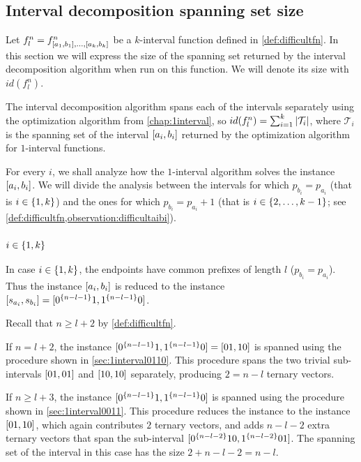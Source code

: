 \subsection{Interval decomposition spanning set size}


Let $f_l^n =
f^n_{[a_1, b_1], \ldots, [a_k, b_k]}$
be a $k$-interval function
defined in \cref{def:difficultfn}.
In this section we will express
the size of the spanning set
returned by the interval decomposition algorithm
when run on this function.
We will denote its size with $id(f_l^n)$.

The interval decomposition algorithm spans
each of the intervals separately
using the optimization algorithm
from \cref{chap:1interval},
so $id(f_l^n) = \sum_{i=1}^k{\lvert\mathcal{T}_i\rvert}$,
where $\mathcal{T}_i$ is the spanning set
of the interval $[a_i, b_i]$
returned by the optimization algorithm
for $1$-interval functions.

For every $i$,
we shall analyze how the $1$-interval algorithm solves
the instance $[a_i, b_i]$.
We will divide the analysis between the intervals
for which $p_{b_i} = p_{a_i}$
(that is $i \in \{1, k\}$)
and the ones for which $p_{b_i} = p_{a_i} + 1$
(that is $i \in \{2, \ldots, k-1\}$;
see
\cref{def:difficultfn,observation:difficultaibi}).

\subsubsection{$i \in \{1, k\}$}

In case $i \in \{1, k\}$,
the endpoints have common prefixes of length $l$
($p_{b_i} = p_{a_i}$).
Thus the instance $[a_i, b_i]$
is reduced to the instance
$[s_{a_i}, s_{b_i}]
= [0^{\{n-l-1\}} 1, 1^{\{n-l-1\}} 0]$.

Recall that $n \geq l + 2$ by \cref{def:difficultfn}.

If $n = l + 2$,
the instance
$[0^{\{n-l-1\}} 1, 1^{\{n-l-1\}} 0]
= [01, 10]$
is spanned using the procedure
shown in \cref{sec:1interval0110}.
This procedure spans the two trivial sub-intervals
$[01, 01]$ and $[10, 10]$
separately,
producing $2 = n-l$ ternary vectors.

If $n \geq l + 3$,
the instance
$[0^{\{n-l-1\}} 1, 1^{\{n-l-1\}} 0]$
is spanned using the procedure
shown in \cref{sec:1interval0011}.
This procedure reduces the instance
to the instance $[01, 10]$,
which again contributes $2$ ternary vectors,
and adds $n-l-2$ extra ternary vectors
that span the sub-interval
$[0^{\{n-l-2\}} 10, 1^{\{n-l-2\}} 01]$.
The spanning set of the interval in this case has the size
$2 + n - l - 2 = n - l$.

